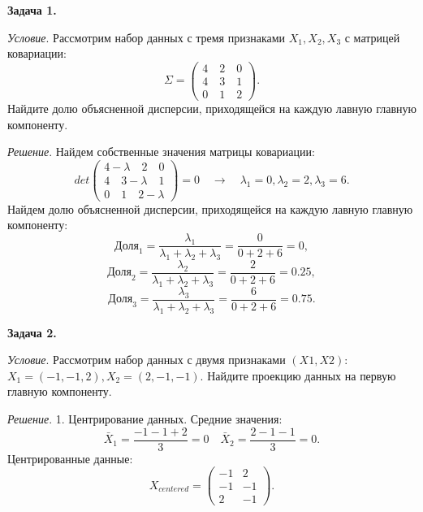 \textbf{Задача 1.}

\textit{Условие}. Рассмотрим набор данных с тремя признаками $X_1, X_2, X_3$ с матрицей ковариации:
\begin{equation}
    \Sigma = \begin{pmatrix} 4 \quad 2 \quad 0 \\ 4 \quad 3 \quad 1 \\ 0 \quad 1 \quad 2 \end{pmatrix}.
\end{equation}
Найдите долю объясненной дисперсии, приходящейся на каждую лавную главную компоненту.

\textit{Решение}. Найдем собственные значения матрицы ковариации:
\begin{equation}
    det \begin{pmatrix} 4 - \lambda \quad 2 \quad 0 \\ 4 \quad 3 - \lambda \quad 1 \\ 0 \quad 1 \quad 2 - \lambda \end{pmatrix} = 0 \quad \rightarrow \quad \lambda_1 = 0, \lambda_2 = 2, \lambda_3 = 6.
\end{equation}
Найдем долю объясненной дисперсии, приходящейся на каждую лавную главную компоненту:
\begin{equation}
    \text{Доля}_1 = \frac{\lambda_1}{\lambda_1 + \lambda_2 + \lambda_3} = \frac{0}{0 + 2 + 6} = 0,
\end{equation}
\begin{equation}
    \text{Доля}_2 = \frac{\lambda_2}{\lambda_1 + \lambda_2 + \lambda_3} = \frac{2}{0 + 2 + 6} = 0.25,
\end{equation}
\begin{equation}
    \text{Доля}_3 = \frac{\lambda_3}{\lambda_1 + \lambda_2 + \lambda_3} = \frac{6}{0 + 2 + 6} = 0.75.
\end{equation}

\textbf{Задача 2.}

\textit{Условие}. Рассмотрим набор данных с двумя признаками $(X1, X2)$: $X_1 = (-1, -1, 2), X_2 = (2, -1, -1)$. Найдите проекцию данных на первую главную компоненту.

\textit{Решение}. 1. Центрирование данных. Средние значения:
\begin{equation}
    \bar{X}_1 = \frac{-1 - 1 + 2}{3} = 0 \quad \bar{X}_2 = \frac{2 - 1 - 1}{3} = 0.
\end{equation}
Центрированные данные:
\begin{equation}
    X_{centered} = \begin{pmatrix} -1 & 2 \\ -1 &  -1 \\ 2 & -1 \end{pmatrix}.
\end{equation}


